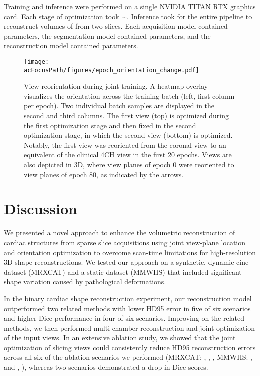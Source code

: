     Training and inference were performed on a single NVIDIA TITAN RTX  graphics card. Each stage of optimization took $\sim$.
    Inference took  for the entire pipeline to reconstruct volumes of  from two  slices. Each acquisition model contained  parameters, the segmentation model contained  parameters, and the reconstruction model contained  parameters.
    \begin{figure}

            \texttt{[image: \\acFocusPath/figures/epoch\_orientation\_change.pdf]}
            \caption{View reorientation during joint training. A heatmap overlay visualizes the orientation across the training batch (left, first column per epoch). Two individual batch samples are displayed in the second and third columns. The first view (top) is optimized during the first optimization stage and then fixed in the second optimization stage, in which the second view (bottom) is optimized. Notably, the first view was reoriented from the coronal view to an equivalent of the clinical 4CH view in the first 20 epochs. Views are also depicted in 3D, where view planes of epoch 0 were reoriented to view planes of epoch 80, as indicated by the arrows.}
        \label{fig:resulting_views}
    \end{figure}

\section{Discussion}

     We presented a novel approach to enhance the volumetric reconstruction of cardiac structures from sparse slice acquisitions using joint view-plane location and orientation optimization to overcome scan-time limitations for high-resolution 3D shape reconstructions.
    We tested our approach on a synthetic, dynamic cine dataset (MRXCAT) and a static dataset (MMWHS) that included significant shape variation caused by pathological deformations.

    In the binary cardiac shape reconstruction experiment, our reconstruction model outperformed two related methods with lower HD95 error in five of six scenarios and higher Dice performance in four of six scenarios. Improving on the related methods, we then performed multi-chamber reconstruction and joint optimization of the input views. In an extensive ablation study, we showed that the joint optimization of slicing views could consistently reduce HD95 reconstruction errors across all six of the ablation scenarios we performed (MRXCAT: , , , MMWHS: , and , ), whereas two scenarios demonstrated a drop in Dice scores.

